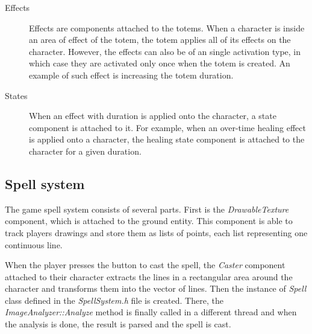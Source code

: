 \begin{description}
\item [Effects]  Effects are components attached to the totems. When a character is inside an area of effect of the totem, the totem applies all of its effects on the character. However, the effects can also be of an single activation type, in which case they are activated only once when the totem is created. An example of such effect is increasing the totem duration.

\item [States] When an effect with duration is applied onto the character, a state component is attached to it. For example, when an over-time healing effect is applied onto a character, the healing state component is attached to the character for a given duration.

\end{description}

\subsection{Spell system}
The game spell system consists of several parts.  First is the \emph{DrawableTexture} component, which is attached to the ground entity. This component is able to track players drawings and store them as lists of points, each list representing one continuous line.

When the player presses the button to cast the spell, the \emph{Caster} component attached to their character extracts the lines in a rectangular area around the character and transforms them into the vector of lines. Then the instance of \emph{Spell} class defined in the \emph{SpellSystem.h} file is created. There, the \emph{ImageAnalyzer::Analyze} method is finally called in a different thread and when the analysis is done, the result is parsed and the spell is cast.

